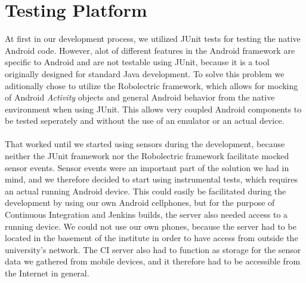 
\section{Testing Platform}
\label{sub:testing_platform}

At first in our development process, we utilized JUnit tests for testing the native Android code. However, alot of different features in the Android framework are specific to Android and are not testable using JUnit, because it is a tool originally designed for standard Java development. To solve this problem we aditionally chose to utilize the Robolectric framework, which allows for mocking of Android \emph{Activity} objects and general Android behavior from the native environment when using JUnit. This allows very coupled Android components to be tested seperately and without the use of an emulator or an actual device. 
\\\\
That worked until we started using sensors during the development, because neither the JUnit framework nor the Robolectric framework facilitate mocked sensor events. Sensor events were an important part of the solution we had in mind, and we therefore decided to start using instrumental tests, which requires an actual running Android device. This could easily be facilitated during the development by using our own Android cellphones, but for the purpose of Continuous Integration and Jenkins builds, the server also needed access to a running device. We could not use our own phones, because the server had to be located in the basement of the institute in order to have access from outside the university's network. The CI server also had to function as storage for the sensor data we gathered from mobile devices, and it therefore had to be accessible from the Internet in general.
\\\\

